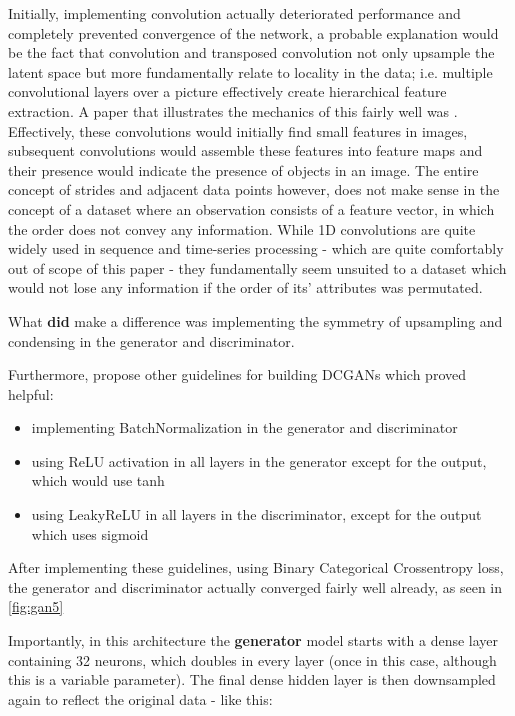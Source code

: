 Initially, implementing convolution actually deteriorated performance and completely prevented convergence of the network, a probable explanation would be the fact that convolution and transposed convolution not only upsample the latent space but more fundamentally relate to locality in the data; i.e. multiple convolutional layers over a picture effectively create hierarchical feature extraction. A paper that illustrates the mechanics of this fairly well was \cite{convolution_arithmetic}. Effectively, these convolutions would initially find small features in images, subsequent convolutions would assemble these features into feature maps and their presence would indicate the presence of objects in an image. The entire concept of strides and adjacent data points however, does not make sense in the concept of a dataset where an observation consists of a feature vector, in which the order does not convey any information. While 1D convolutions are quite widely used in sequence and time-series processing - which are quite comfortably out of scope of this paper - they fundamentally seem unsuited to a dataset which would not lose any information if the order of its' attributes was permutated.

What \textbf{did} make a difference was implementing the symmetry of upsampling and condensing in the generator and discriminator.

Furthermore, \cite{dcgan} propose other guidelines for building \acp{DCGAN} which proved helpful:

\begin{itemize}
	\item implementing BatchNormalization in the generator and discriminator \cite{batchnorm}
	\item using ReLU activation in all layers in the generator except for the output, which would use tanh
	\item using LeakyReLU in all layers in the discriminator, except for the output which uses sigmoid
\end{itemize}

After implementing these guidelines, using Binary Categorical Crossentropy loss, the generator and discriminator actually converged fairly well already, as seen in \ref{fig:gan5}


Importantly, in this architecture the \textbf{generator} model starts with a dense layer containing 32 neurons, which doubles in every layer (once in this case, although this is a variable parameter). The final dense hidden layer is then downsampled again to reflect the original data - like this:

